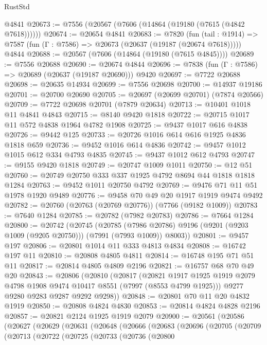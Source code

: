 \begin{lexlean}{RustStd}
\begin{coremodule}
    @4841
@20673 := @7556 (@20567 (@7606 (@14864 (@19180 (@7615 (@4842 @7618))))))
@20674 := @20654 @4841
@20683 := @7820
    (fun (tail : @1914) => @7587 (fun (Γ : @7586) => @20673 (@20637 (@19187 (@20674 @7618)))))
    @4844
@20688 := @20567 (@7606 (@14864 (@19180 (@7615 @4845))))
@20689 := @7556 @20688
@20690 := @20674 @4844
@20696 := @7838 (fun (Γ : @7586) => @20689 (@20637 (@19187 @20690))) @9420
@20697 := @7722 @20688
@20698 := @20635 @14934
@20699 := @7556 @20698
@20700 := @14937 @19186
@20701 := @20700 @20690
@20705 := @20697 (@20699 @20701) (@7874 @20566)
@20709 := @7722 @20698 @20701 (@7879 @20634)
@20713 := @10401 @1018 @11 @4841 @4843
@20715 := @8140 @9420 @1818
@20722 := @20715 @1017 @11 @572 @4838 @1964 @4782 @1908
@20725 := @9437 @1017 @616 @4838
@20726 := @9442 @125
@20733 := @20726 @1016 @614 @616 @1925 @4836 @1818 @659
@20736 := @9452 @1016 @614 @4836
@20742 := @9457 @1012 @1015 @612 @334 @4793 @4835
@20745 := @9437 @1012 @612 @4793
@20747 := @9155 @9420 @1818
@20749 := @20747 @1009 @1011
@20750 := @12 @51
@20760 := @20749 @20750 @333 @337 @1925 @4792 @8694 @44 @1818 @1818 @1284
@20763 := @9452 @1011 @20750 @4792
@20769 := @9476 @71 @11 @51 @1978 @1920 @9489
@20776 := @9458 @70 @49 @20 @1917 @1919 @9474 @9492
@20782 := @20760 (@20763 (@20769 @20776)) (@7766 (@9182 @1009))
@20783 := @7640 @1284
@20785 := @20782 (@7982 @20783)
@20786 := @7664 @1284
@20800 := @20742
    (@20745
      (@20785
        (@7986 @20786)
        @9196
        (@9201 (@9203 @1009 (@9205 @20750)))
        (@7991 (@7993 @1009))
        @8003))
@20801 := @9457 @197
@20806 := @20801 @1014 @11 @333 @4813 @4834
@20808 := @16742 @197 @11
@20810 := @20808 @4805 @4811
@20814 := @16748 @195 @71 @51 @11
@20817 := @20814 @4805 @4809 @2196
@20821 := @16757 @68 @70 @49 @20
@20843 := @20806
    (@20810
      (@20817
        (@20821 @1917 @1925 @1919 @2079 @4798 @1908 @9474 @10417 @8551 (@7997 (@8553 @4799 @1925)))
        @9277
        @9280
        @9283
        @9287
        @9292
        @9298))
@20848 := @20801 @70 @11 @20 @4832 @1919
@20850 := @20808 @4824 @4830
@20853 := @20814 @4824 @4828 @2196
@20857 := @20821 @2124 @1925 @1919 @2079
@20900 := @20561
    (@20586
      (@20627
        (@20629
          (@20631
            (@20648
              (@20666
                (@20683
                  (@20696
                    (@20705
                      (@20709
                        (@20713
                          (@20722
                            (@20725
                              (@20733
                                (@20736
                                  (@20800

\end{coremodule}
\end{lexlean}
